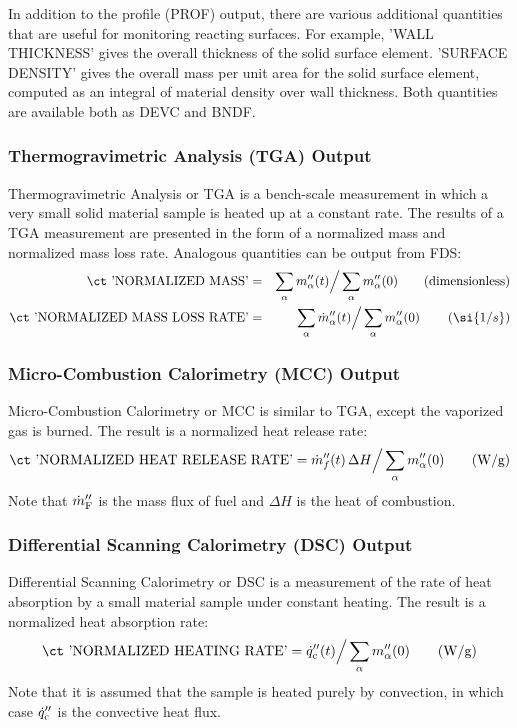 \documentclass[11pt]{book}
\begin{document}
In addition to the profile ({\ct PROF}) output, there are various additional quantities that are useful for monitoring reacting
surfaces. For example, {\ct 'WALL THICKNESS'} gives the overall thickness of the solid surface
element. {\ct 'SURFACE DENSITY'} gives the overall mass per unit area for the
solid surface element, computed as an integral of material density over wall
thickness. Both quantities are available both as {\ct DEVC} and {\ct BNDF}.

\subsubsection{Thermogravimetric Analysis (TGA) Output}

Thermogravimetric Analysis or TGA is a bench-scale measurement in which a very small solid material sample is heated up at a constant rate. The results of a TGA measurement are presented in the form of a normalized mass and normalized mass loss rate. Analogous quantities can be output from FDS:
\begin{eqnarray*}
   \hbox{\ct 'NORMALIZED MASS'} &=& \sum_\alpha  m''_\alpha (t) \Big/ \sum_\alpha  m''_\alpha (0) \quad \quad \hbox{(dimensionless)} \\
   \hbox{\ct 'NORMALIZED MASS LOSS RATE'} &=& \sum_\alpha  \dot{m}''_\alpha (t) \Big/ \sum_\alpha  m''_\alpha (0)  \quad \quad \left( \si{1/s} \right)
\end{eqnarray*}

\subsubsection{Micro-Combustion Calorimetry (MCC) Output}

Micro-Combustion Calorimetry or MCC is similar to TGA, except the vaporized gas is burned. The result is a normalized heat release rate:
\begin{equation*}
   \hbox{\ct 'NORMALIZED HEAT RELEASE RATE'} =  \dot{m}''_f (t) \, \Delta H \Big/ \sum_\alpha  m''_\alpha (0) \quad \quad \hbox{(W/g)}
\end{equation*}
Note that $\dot{m}''_{\rm F}$ is the mass flux of fuel and $\Delta H$ is the heat of combustion.


\subsubsection{Differential Scanning Calorimetry (DSC) Output}

Differential Scanning Calorimetry or DSC is a measurement of the rate of heat absorption by a small material sample under constant heating. The result is a normalized heat absorption rate:
\begin{equation*}
   \hbox{\ct 'NORMALIZED HEATING RATE'} =  \dot{q}''_{\rm c} (t) \Big/ \sum_\alpha  m''_\alpha (0) \quad \quad \hbox{(W/g)}
\end{equation*}
Note that it is assumed that the sample is heated purely by convection, in which case $\dot{q}_{\rm c}''$ is the convective heat flux.
\end{document}
